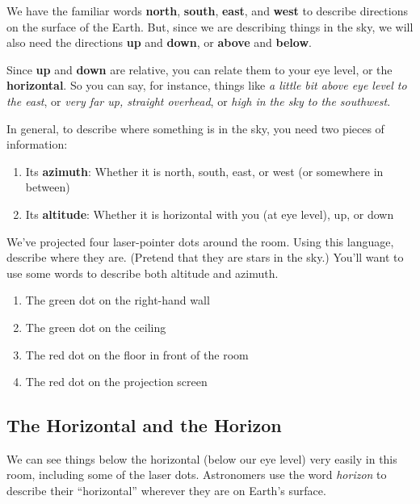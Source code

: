 \documentclass[12pt]{article}
\newcommand{\BS}{\bigskip}
\begin{document}
	We have the familiar words {\bf north}, {\bf south}, {\bf east}, and {\bf west} to describe directions on the surface of the Earth. But, since we are describing things in the sky, we will also need the directions {\bf up} and {\bf down}, or {\bf above} and {\bf below}.
	
	Since {\bf up} and {\bf down} are relative, you can relate them to your eye level, or the {\bf horizontal}. So you can say, for instance, things like {\it a little bit above eye level to the east}, or {\it very far up, straight overhead}, or {\it high in the sky to the southwest}.
	
	In general, to describe where something is in the sky, you need two pieces of information:
	
	\begin{enumerate}
		\item Its {\bf azimuth}: Whether it is north, south, east, or west (or somewhere in between)
		\item Its {\bf altitude}: Whether it is horizontal with you (at eye level), up, or down
	\end{enumerate}
		\newpage
	We've projected four laser-pointer dots around the room. Using this language, describe where they are. (Pretend that they are stars in the sky.) You'll want to use some words to describe both altitude and azimuth.
	
		
	\begin{enumerate}
		\item The green dot on the right-hand wall

\BS\BS\BS
		
		\item The green dot on the ceiling
	
	\BS\BS\BS	
		\item The red dot on the floor in front of the room
\BS\BS\BS

		
		\item The red dot on the projection screen
\BS\BS\BS
		
	\end{enumerate}


\subsection{The Horizontal and the Horizon}

We can see things below the horizontal (below our eye level) very easily in this room, including some of the laser dots. Astronomers use the word {\it horizon} to describe their ``horizontal'' wherever they are on Earth's surface. 
\end{document}
